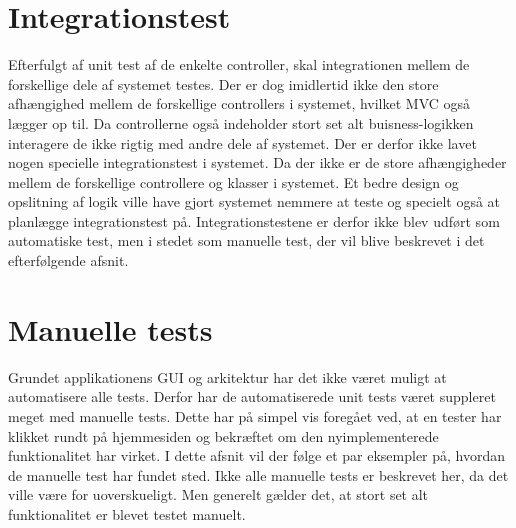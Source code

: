 \section{Integrationstest}
%
%
Efterfulgt af unit test af de enkelte controller, skal integrationen mellem de forskellige dele af systemet testes. Der er dog imidlertid ikke den store afhængighed mellem de forskellige controllers i systemet, hvilket MVC også lægger op til. Da controllerne også indeholder stort set alt buisness-logikken interagere de ikke rigtig med andre dele af systemet. Der er derfor ikke lavet nogen specielle integrationstest i systemet. Da der ikke er de store afhængigheder mellem de forskellige controllere og klasser i systemet. Et bedre design og opslitning af logik ville have gjort systemet nemmere at teste og specielt også at planlægge integrationstest på. Integrationstestene er derfor ikke blev udført som automatiske test, men i stedet som manuelle test, der vil blive beskrevet i det efterfølgende afsnit.
 \\

\section{Manuelle tests}
Grundet applikationens GUI og arkitektur har det ikke været muligt at automatisere alle tests. Derfor har de automatiserede unit tests været suppleret meget med manuelle tests. Dette har på simpel vis foregået ved, at en tester har klikket rundt på hjemmesiden og bekræftet om den nyimplementerede funktionalitet har virket. I dette afsnit vil der følge et par eksempler på, hvordan de manuelle test har fundet sted. Ikke alle manuelle tests er beskrevet her, da det ville være for uoverskueligt. Men generelt gælder det, at stort set alt funktionalitet er blevet testet manuelt.

